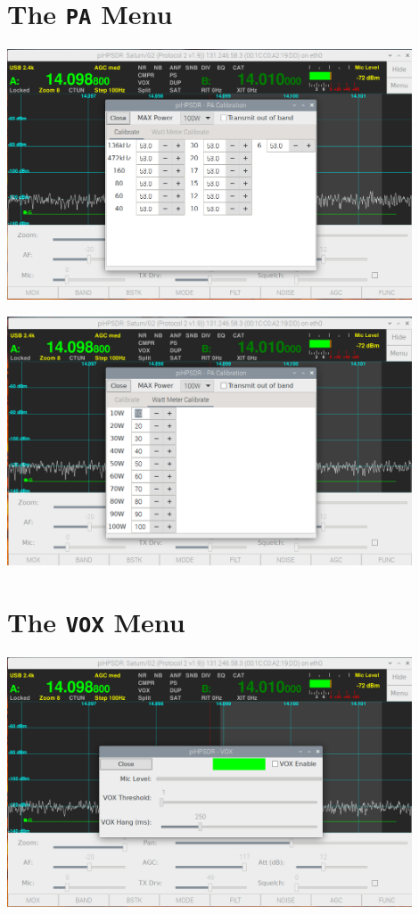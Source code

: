 \documentclass[12pt]{book}
\begin{document}
\section{The \texttt{PA} Menu}
\begin{center}
\includegraphics[width=12cm]{PAMenuCalibrate.png}
\end{center}

\begin{center}
\includegraphics[width=12cm]{PAMenuWatt.png}
\end{center}

\section{The \texttt{VOX} Menu}
\begin{center}
\includegraphics[width=12cm]{VOXMenu.png}
\end{center}
\end{document}

